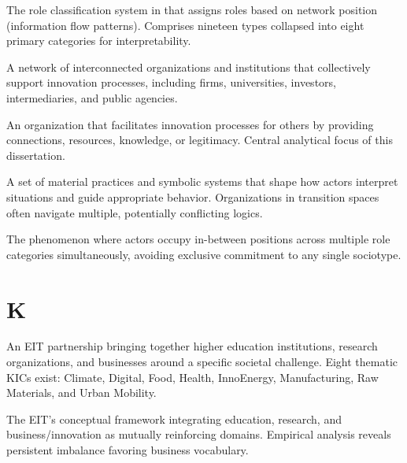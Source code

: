 \documentclass[../main.tex]{subfiles}
\begin{document}
\begin{description}[leftmargin=0.5cm, style=nextline]

\item[Influence Typology] The role classification system in \RoleSim{} that assigns roles based on network position (information flow patterns). Comprises nineteen types collapsed into eight primary categories for interpretability.

\item[Innovation Ecosystem] A network of interconnected organizations and institutions that collectively support innovation processes, including firms, universities, investors, intermediaries, and public agencies.

\item[Innovation Intermediary] An organization that facilitates innovation processes for others by providing connections, resources, knowledge, or legitimacy. Central analytical focus of this dissertation.

\item[Institutional Logic] A set of material practices and symbolic systems that shape how actors interpret situations and guide appropriate behavior. Organizations in transition spaces often navigate multiple, potentially conflicting logics.

\item[Interstitial Pluralism] The phenomenon where actors occupy in-between positions across multiple role categories simultaneously, avoiding exclusive commitment to any single sociotype.

\end{description}

\section*{K}

\begin{description}[leftmargin=0.5cm, style=nextline]

\item[KIC (Knowledge and Innovation Community)] An EIT partnership bringing together higher education institutions, research organizations, and businesses around a specific societal challenge. Eight thematic KICs exist: Climate, Digital, Food, Health, InnoEnergy, Manufacturing, Raw Materials, and Urban Mobility.

\item[Knowledge Triangle] The EIT's conceptual framework integrating education, research, and business/innovation as mutually reinforcing domains. Empirical analysis reveals persistent imbalance favoring business vocabulary.

\end{description}
\end{document}
